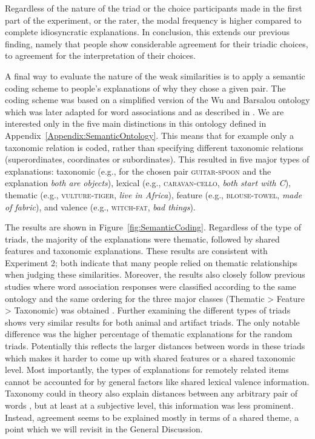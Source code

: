 \documentclass[doc]{apa6}
\newcommand{\stimulus}[1]{\textsc{#1}}
\begin{document}
Regardless of the nature of the triad or the choice participants made in the first part of the experiment, or the rater, the modal frequency is higher compared to complete idiosyncratic explanations.
In conclusion, this extends our previous finding, namely that people show considerable agreement for their triadic choices, to agreement for the interpretation of their choices.


A final way to evaluate the nature of the weak similarities is to apply a semantic coding scheme to people's explanations of why they chose a given pair. The coding scheme was based on a simplified version of the Wu and Barsalou ontology  \parencite{Wu2009,McRae2005,Brainerd2008,Santos2011} which was later adapted for word associations and as described in \textcite{DeDeyne2008b}. We are interested only in the five main distinctions in this ontology defined in Appendix~\ref{Appendix:SemanticOntology}. This means that for example only a taxonomic relation is coded, rather than specifying different taxonomic relations (superordinates, coordinates or subordinates).  This resulted in five major types of explanations: taxonomic (e.g., for the chosen pair \stimulus{guitar}-\stimulus{spoon} and the explanation \textit{both are objects}),  lexical  (e.g., \stimulus{caravan}-\stimulus{cello}, \textit{both start with C}), thematic (e.g., \stimulus{vulture}-\stimulus{tiger}, \textit{live in Africa}), feature (e.g., \stimulus{blouse}-\stimulus{towel}, \textit{made of fabric}), and valence  (e.g., \stimulus{witch}-\stimulus{fat}, \textit{bad things}).


The results are shown in Figure~\ref{fig:SemanticCoding}. Regardless of the type of triads, the majority of the explanations were thematic, followed by shared features and taxonomic explanations. These results are consistent with Experiment 2; both indicate that many people relied on thematic relationships when judging these similarities. Moreover, the results also closely follow previous studies where word association responses were classified according to the same ontology and the same ordering for the three major classes (Thematic > Feature > Taxonomic) was obtained \parencite{DeDeyne2008b}.
Further examining the different types of triads shows very similar results for both animal and artifact triads.
The only notable difference was the higher percentage of thematic explanations for the random triads. Potentially this reflects the larger distances between words in these triads which makes it harder to come up with shared features or a shared taxonomic level.
Most importantly, the types of explanations for remotely related items cannot be accounted for by general factors like shared lexical valence information. Taxonomy could in theory also explain distances between any arbitrary pair of words \parencite[cf. WordNET,][]{Fellbaum1998}, but at least at a subjective level, this information was less prominent. Instead, agreement seems to be explained mostly in terms of a shared theme, a point which we will revisit in the General Discussion.
\end{document}
